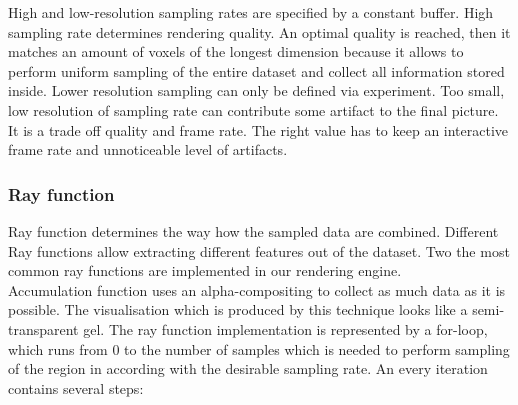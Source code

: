 \documentclass[twoside, english, 11pt]{report}
\begin{document}
High and low-resolution sampling rates are specified by a constant buffer. High sampling rate determines rendering quality. An optimal quality is reached, then it matches an amount of voxels of the longest dimension because it allows to perform uniform sampling of the entire dataset and collect all information stored inside. Lower resolution sampling can only be defined via experiment. Too small, low resolution of sampling rate can contribute some artifact to the final picture. It is a trade off quality and frame rate. The right value has to keep an interactive frame rate and unnoticeable level of artifacts.


\subsubsection{Ray function}
Ray function determines the way how the sampled data are combined. Different Ray functions allow extracting different features out of the dataset. Two the most common ray functions are implemented in our rendering engine.\\

Accumulation function uses an alpha-compositing to collect as much data as it is possible. The visualisation which is produced by this technique looks like a semi-transparent gel. The ray function implementation is represented by a for-loop, which runs from 0 to the number of samples which is needed to perform sampling of the region in according with the desirable sampling rate. An every iteration contains several steps:
\end{document}

